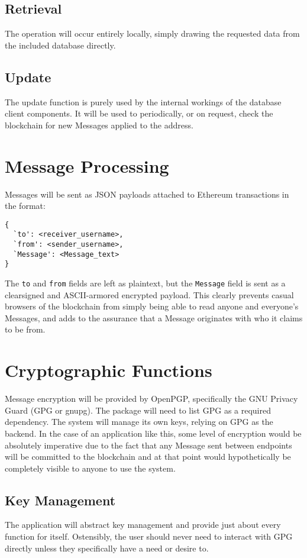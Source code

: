 \documentclass[]{article}
\begin{document}
\subsection{Retrieval}
The operation will occur entirely locally, simply drawing the requested data from the included database directly.
\subsection{Update}
The update function is purely used by the internal workings of the database client components. It will be used to periodically, or on request, check the blockchain for new Messages applied to the address.

\section{Message Processing}
Messages will be sent as JSON payloads attached to Ethereum transactions in the format:
\begin{verbatim}
{
  `to': <receiver_username>,
  `from': <sender_username>,
  `Message': <Message_text>
}
\end{verbatim}
The \verb!to! and \verb!from! fields are left as plaintext, but the \verb!Message! field is sent as a clearsigned and ASCII-armored encrypted payload. This clearly prevents casual browsers of the blockchain from simply being able to read anyone and everyone's Messages, and adds to the assurance that a Message originates with who it claims to be from.

\section{Cryptographic Functions}
Message encryption will be provided by OpenPGP, specifically the GNU Privacy Guard (GPG or gnupg). The package will need to list GPG as a required dependency. The system will manage its own keys, relying on GPG as the backend. In the case of an application like this, some level of encryption would be absolutely imperative due to the fact that any Message sent between endpoints will be committed to the blockchain and at that point would hypothetically be completely visible to anyone to use the system.
\subsection{Key Management}
The application will abstract key management and provide just about every function for itself. Ostensibly, the user should never need to interact with GPG directly unless they specifically have a need or desire to.
\end{document}
